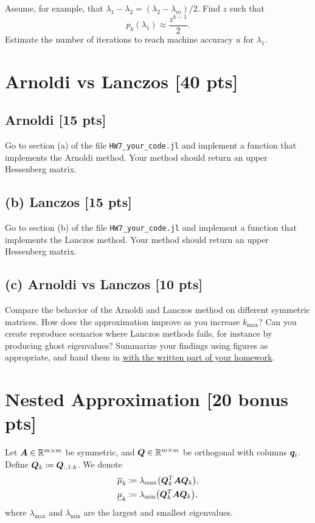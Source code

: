 \documentclass[twoside,10pt]{article}
\begin{document}
Assume, for example, that $\lambda_1 - \lambda_2 = (\lambda_2 - \lambda_m) / 2.$  
Find $z$ such that 
\begin{equation}
  p_k (\lambda_1) \approx \frac{z^{k - 1}}{2}.
\end{equation}
Estimate the number of iterations to reach machine accuracy $u$ for $\lambda_1$. 

\section{Arnoldi vs Lanczos [40 pts]}
\subsection*{Arnoldi [15 pts]} 
Go to section (a) of the file \texttt{HW7\_your\_code.jl} and implement a function that implements the Arnoldi method. 
Your method should return an upper Hessenberg matrix. 

\subsection*{(b) Lanczos [15 pts]} 
Go to section (b) of the file \texttt{HW7\_your\_code.jl} and implement a function that implements the Lanczos method. 
Your method should return an upper Hessenberg matrix. 

\subsection*{(c) Arnoldi vs Lanczos [10 pts]}
Compare the behavior of the Arnoldi and Lanczos method on different symmetric matrices. 
How does the approximation improve as you increase $k_{\max}$? 
Can you create reproduce scenarios where Lanczos methods fails, for instance by producing ghost eigenvalues?
Summarize your findings using figures as appropriate, and hand them in \underline{with the written part of your homework}. 

\section{Nested Approximation [20 bonus pts]}
Let $\bm{A} \in \mathbb{R}^{m \times m}$ be symmetric, and $\bm{Q} \in \mathbb{R}^{m \times m}$ be orthogonal with columns $\bm{q}_i$. 
Define $\bm{Q}_k \coloneqq \bm{Q}_{:, 1 : k}$. 
We denote 
\begin{align}
  \overline{\mu}_k &\coloneqq \lambda_{\max} \left(\mtx{Q}_k^T \mtx{A} \mtx{Q}_k\right),\\
  \underline{\mu}_k &\coloneqq \lambda_{\min}\left(\mtx{Q}^T_k \mtx{A} \mtx{Q}_k\right),
\end{align}
where $\lambda_{\max}$ and $\lambda_{\min}$ are the largest and smallest eigenvalues.
\end{document}
